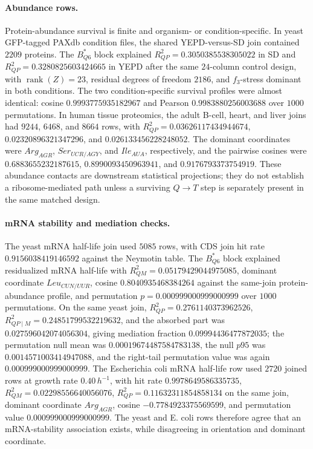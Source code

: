 \paragraph{Abundance rows.}
Protein-abundance survival is finite and organism- or condition-specific. In yeast GFP-tagged PAXdb condition files, the shared YEPD-versus-SD join contained $2209$ proteins. The $B^{*}_{Q6}$ block explained $R^2_{QP}=0.3050385538305022$ in SD and $R^2_{QP}=0.3280825603424665$ in YEPD after the same $24$-column control design, with $\operatorname{rank}(Z)=23$, residual degrees of freedom $2186$, and $f_3$-stress dominant in both conditions. The two condition-specific survival profiles were almost identical: cosine $0.9993775935182967$ and Pearson $0.9983880256003688$ over $1000$ permutations. In human tissue proteomics, the adult B-cell, heart, and liver joins had $9244$, $6468$, and $8664$ rows, with $R^2_{QP}=0.03626117434944674$, $0.02320896321347296$, and $0.026133456228248052$. The dominant coordinates were $Arg_{AGR}$, $Ser_{UCR/AGY}$, and $Ile_{AUA}$, respectively, and the pairwise cosines were $0.6883655232187615$, $0.8990093450963941$, and $0.9176793373754919$. These abundance contacts are downstream statistical projections; they do not establish a ribosome-mediated path unless a surviving $Q\to T$ step is separately present in the same matched design.

\paragraph{mRNA stability and mediation checks.}
The yeast mRNA half-life join used $5085$ rows, with CDS join hit rate $0.9156038419146592$ against the Neymotin table. The $B^{*}_{Q6}$ block explained residualized mRNA half-life with $R^2_{QM}=0.05179429044975085$, dominant coordinate $Leu_{CUN/UUR}$, cosine $0.8040935468384264$ against the same-join protein-abundance profile, and permutation $p=0.000999000999000999$ over $1000$ permutations. On the same yeast join, $R^2_{QP}=0.2761140373962526$, $R^2_{QP\mid M}=0.24851799532219632$, and the absorbed part was $0.027596042074056304$, giving mediation fraction $0.09994436477872035$; the permutation null mean was $0.00019674487584783138$, the null $p95$ was $0.0014571003414947088$, and the right-tail permutation value was again $0.000999000999000999$. The Escherichia coli mRNA half-life row used $2720$ joined rows at growth rate $0.40\,h^{-1}$, with hit rate $0.9978649586335735$, $R^2_{QM}=0.02298556640056076$, $R^2_{QP}=0.11632311854858134$ on the same join, dominant coordinate $Arg_{AGR}$, cosine $-0.7784923375569599$, and permutation value $0.000999000999000999$. The yeast and E. coli rows therefore agree that an mRNA-stability association exists, while disagreeing in orientation and dominant coordinate.

